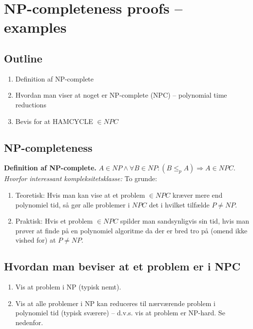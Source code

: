 \section{NP-completeness proofs -- examples}

\subsection*{Outline}

\begin{enumerate}
	\item Definition af NP-complete 
	\item Hvordan man viser at noget er NP-complete (NPC) -- polynomial time reductions
	\item Bevis for at HAMCYCLE $\in NPC$
\end{enumerate}

\subsection*{NP-completeness}

\textbf{Definition af NP-complete.} $A \in NP \wedge \forall B \in NP: (B \le_p A) \Longrightarrow A \in NPC$. \\

\textit{Hvorfor interessant kompleksitetsklasse:} To grunde:
\begin{enumerate}
	\item Teoretisk: Hvis man kan vise at et problem $\in NPC$ kræver mere end polynomiel tid, så gør alle problemer i $NPC$ det i hvilket tilfælde $P \ne NP$.
	\item Praktisk: Hvis et problem $\in NPC$ spilder man sandsynligvis sin tid, hvis man prøver at finde på en polynomiel algoritme da der er bred tro på (omend ikke vished for) at $P \ne NP$.  
\end{enumerate}

\subsection*{Hvordan man beviser at et problem er i NPC}

\begin{enumerate}
	\item Vis at problem i NP (typisk nemt). 
	\item Vis at alle problemer i NP kan reduceres til nærværende problem i polynomiel tid (typisk sværere) -- d.v.s. vis at problem er NP-hard. Se nedenfor. 
\end{enumerate}

